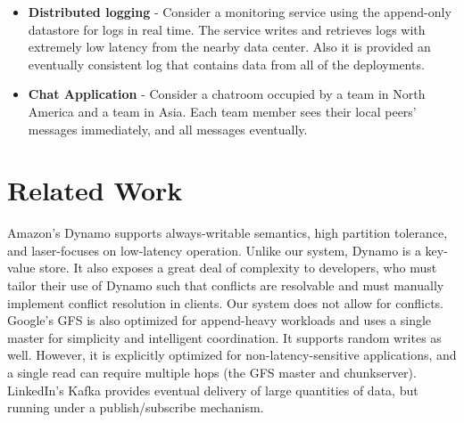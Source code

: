 \documentclass[11pt,english,twocolumn]{article}
\begin{document}
\begin{itemize}
	\item \textbf{Distributed logging} - Consider a monitoring service using
		the append-only datastore for logs in real time. The service
		writes and retrieves logs with extremely low latency from the
		nearby data center. Also it is provided an eventually consistent
		log that contains data from all of the deployments.
	\item \textbf{Chat Application} - Consider a chatroom
		occupied by a team in North America and a team in Asia. Each
		team member sees their local peers' messages immediately, and
		all messages eventually.
\end{itemize}

\section{Related Work}
Amazon's Dynamo \cite{Dynamo} supports always-writable semantics, high partition
tolerance, and laser-focuses on low-latency operation. Unlike our system, Dynamo
is a key-value store. It also exposes a great deal of complexity to developers,
who must tailor their use of Dynamo such that conflicts are resolvable and
must manually implement conflict resolution in clients. Our system does not
allow for conflicts. Google's GFS \cite{GFS} is also optimized for append-heavy workloads and uses a
single master for simplicity and intelligent coordination. It supports random
writes as well. However, it is explicitly optimized for non-latency-sensitive
applications, and a single read can require multiple hops (the GFS master and
chunkserver). LinkedIn's Kafka \cite{Kafka} provides eventual delivery of large
quantities of data, but running under a publish/subscribe
mechanism.

\vspace{-0.4cm}
\end{document}
